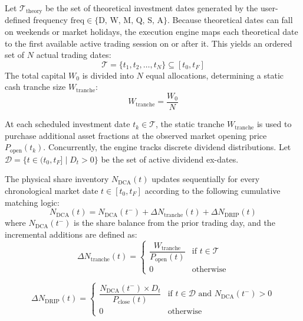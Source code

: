 \documentclass[11pt,a4paper]{article}
\begin{document}
Let $\mathcal{T}_{\text{theory}}$ be the set of theoretical investment dates generated by the user-defined frequency $\text{freq} \in \{\text{D, W, M, Q, S, A}\}$. Because theoretical dates can fall on weekends or market holidays, the execution engine maps each theoretical date to the first available active trading session on or after it. This yields an ordered set of $N$ actual trading dates:
\begin{equation}
\mathcal{T} = \{t_1, t_2, \dots, t_N\} \subseteq [t_0, t_F]
\end{equation}
The total capital $W_0$ is divided into $N$ equal allocations, determining a static cash tranche size $W_{\text{tranche}}$:
\begin{equation}
W_{\text{tranche}} = \frac{W_0}{N}
\end{equation}

At each scheduled investment date $t_k \in \mathcal{T}$, the static tranche $W_{\text{tranche}}$ is used to purchase additional asset fractions at the observed market opening price $P_{\text{open}}(t_k)$. Concurrently, the engine tracks discrete dividend distributions. Let $\mathcal{D} = \{t \in (t_0, t_F] \mid D_t > 0\}$ be the set of active dividend ex-dates.

The physical share inventory $N_{\text{DCA}}(t)$ updates sequentially for every chronological market date $t \in [t_0, t_F]$ according to the following cumulative matching logic:
\begin{equation}
N_{\text{DCA}}(t) = N_{\text{DCA}}(t^-) + \Delta N_{\text{tranche}}(t) + \Delta N_{\text{DRIP}}(t)
\end{equation}
where $N_{\text{DCA}}(t^-)$ is the share balance from the prior trading day, and the incremental additions are defined as:
\begin{equation}
\Delta N_{\text{tranche}}(t) = \begin{cases}
\dfrac{W_{\text{tranche}}}{P_{\text{open}}(t)} & \text{if } t \in \mathcal{T} \\
0 & \text{otherwise}
\end{cases}
\end{equation}

\begin{equation}
\Delta N_{\text{DRIP}}(t) = \begin{cases}
\dfrac{N_{\text{DCA}}(t^-) \times D_t}{P_{\text{close}}(t)} & \text{if } t \in \mathcal{D} \text{ and } N_{\text{DCA}}(t^-) > 0 \\
0 & \text{otherwise}
\end{cases}
\end{equation}
\end{document}
